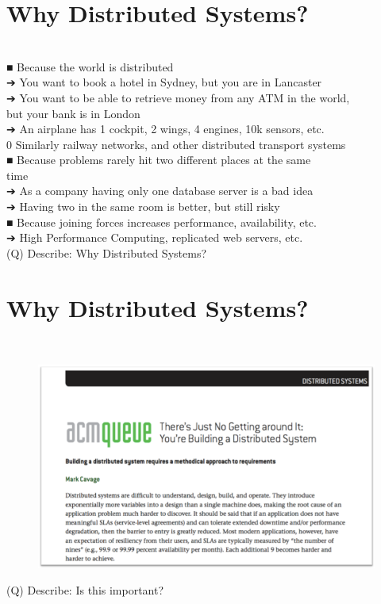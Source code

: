 \documentclass[12pt]{article}
\begin{document}
\section{Why Distributed Systems?}
\\
■ Because the world is distributed\\
➔ You want to book a hotel in Sydney, but you are in Lancaster\\
➔ You want to be able to retrieve money from any ATM in the world, \\
but your bank is in London\\
➔ An airplane has 1 cockpit, 2 wings, 4 engines, 10k sensors, etc.\\
0 Similarly railway networks, and other distributed transport systems\\
■ Because problems rarely hit two different places at the same \\
time\\
➔ As a company having only one database server is a bad idea\\
➔ Having two in the same room is better, but still risky\\
■ Because joining forces increases performance, availability, etc.\\
➔ High Performance Computing, replicated web servers, etc.\\
\clearpage
(Q)
Describe: Why Distributed Systems?
\clearpage
\section{Why Distributed Systems?}
\\
\begin{figure}[H]
\includegraphics[width=0.5\linewidth]{page11-image-1.png}
\end{figure}
\clearpage
(Q)
Describe: Is this important?
\clearpage
\end{document}
